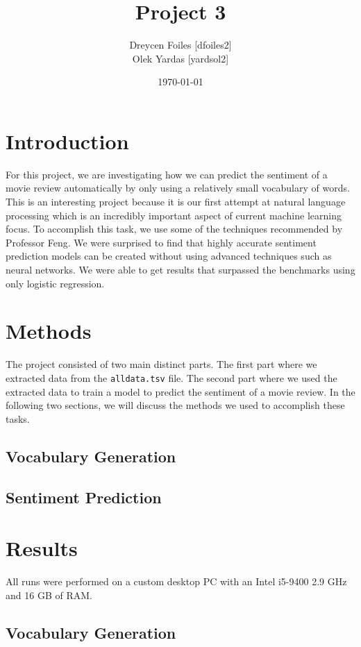 \documentclass{article}
\title{Project 3}
\author{Dreycen Foiles [dfoiles2] \\ Olek Yardas [yardsol2]}
\date{\today}
\begin{document}
\maketitle

\section{Introduction}

For this project, we are investigating how we can predict the sentiment of a movie review automatically by only using a relatively small vocabulary of words. This is an interesting project because it is our first attempt at natural language processing which is an incredibly important aspect of current machine learning focus. To accomplish this task, we use some of the techniques recommended by Professor Feng. We were surprised to find that highly accurate sentiment prediction models can be created without using advanced techniques such as neural networks. We were able to get results that surpassed the benchmarks using only logistic regression. 

\section{Methods}

The project consisted of two main distinct parts. The first part where we extracted data from the \verb,alldata.tsv, file. The second part where we used the extracted data to train a model to predict the sentiment of a movie review. In the following two sections, we will discuss the methods we used to accomplish these tasks.

\subsection{Vocabulary Generation}

\subsection{Sentiment Prediction}

\section{Results}

All runs were performed on a custom desktop PC with an Intel i5-9400 2.9 GHz and 16 GB of RAM. 

\subsection{Vocabulary Generation}
\end{document}
